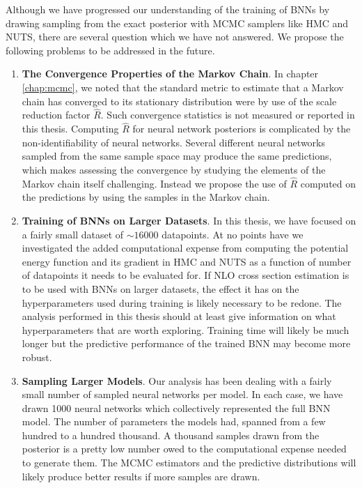 Although we have progressed our understanding of the training of BNNs by drawing sampling from the exact posterior with MCMC samplers like HMC and NUTS, there are several question which we have not answered. We propose the following problems to be addressed in the future.
\begin{enumerate}
    \item \textbf{The Convergence Properties of the Markov Chain}. In chapter \ref{chap:mcmc}, we noted that the standard metric to estimate that a Markov chain has converged to its stationary distribution were by use of the scale reduction factor $\hat{R}$. Such convergence statistics is not measured or reported in this thesis. Computing $\hat{R}$ for neural network posteriors is complicated by the non-identifiability of neural networks. Several different neural networks sampled from the same sample space may produce the same predictions, which makes assessing the convergence by studying the elements of the Markov chain itself challenging. Instead we propose the use of $\hat{R}$ computed on the predictions by using the samples in the Markov chain. 
    \item \textbf{Training of BNNs on Larger Datasets}. In this thesis, we have focused on a fairly small dataset of $\sim 16000$ datapoints. At no points have we investigated the added computational expense from computing the potential energy function and its gradient in HMC and NUTS as a function of number of datapoints it needs to be evaluated for. If NLO cross section estimation is to be used with BNNs on larger datasets, the effect it has on the hyperparameters used during training is likely necessary to be redone. The analysis performed in this thesis should at least give information on what hyperparameters that are worth exploring. Training time will likely be much longer but the predictive performance of the trained BNN may become more robust.
    \item \textbf{Sampling Larger Models}. Our analysis has been dealing with a fairly small number of sampled neural networks per model. In each case, we have drawn 1000 neural networks which collectively represented the full BNN model. The number of parameters the models had, spanned from a few hundred to a hundred thousand. A thousand samples drawn from the posterior is a pretty low number owed to the computational expense needed to generate them. The MCMC estimators and the predictive distributions will likely produce better results if more samples are drawn.

\end{enumerate}
